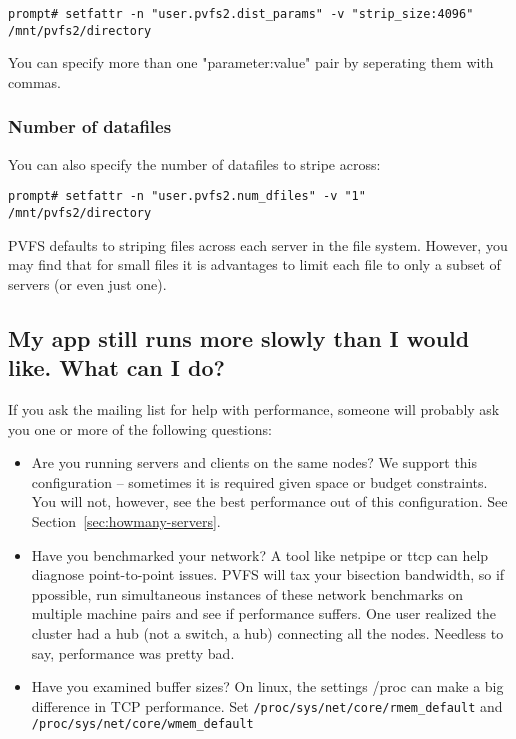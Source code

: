 \documentclass[11pt,letterpaper]{article}
\begin{document}
\begin{verbatim}
prompt# setfattr -n "user.pvfs2.dist_params" -v "strip_size:4096" /mnt/pvfs2/directory
\end{verbatim}

You can specify more than one "parameter:value" pair by seperating them with
commas.

\subsubsection{Number of datafiles}

You can also specify the number of datafiles to stripe across: 

\begin{verbatim}
prompt# setfattr -n "user.pvfs2.num_dfiles" -v "1" /mnt/pvfs2/directory
\end{verbatim}

PVFS defaults to striping files across each server in the file system.
However, you may find that for small files it is advantages to limit each
file to only a subset of servers (or even just one).

\subsection{My app still runs more slowly than I would like.  What can I do?}
\label{sec:tuning}

If you ask the mailing list for help with performance, someone will probably
ask you one or more of the following questions:

\begin{itemize}

\item Are you running servers and clients on the same nodes?  We support this
      configuration -- sometimes it is required given space or budget
      constraints.  You will not, however, see the best performance out of this
      configuration.  See Section~\ref{sec:howmany-servers}. 

\item Have you benchmarked your network?  A tool like netpipe or ttcp can help
      diagnose point-to-point issues.  PVFS will tax your bisection bandwidth,
      so if ppossible, run simultaneous instances of these network benchmarks
      on multiple machine pairs and see if performance suffers.  One user
      realized the cluster had a hub (not a switch, a hub) connecting all the
      nodes.  Needless to say, performance was pretty bad. 

\item Have you examined buffer sizes?  On linux, the settings /proc can make a
      big difference in TCP performance.  Set
      \texttt{/proc/sys/net/core/rmem\_default} and
      \texttt{/proc/sys/net/core/wmem\_default} 

\end{itemize}
\end{document}
